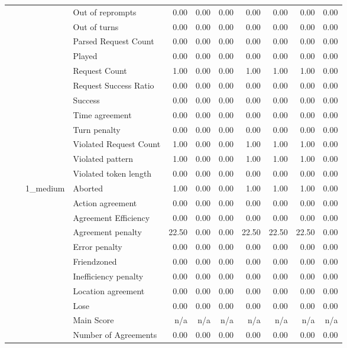 \begin{tabular}{llllrrrrrrr}
 &  &  & Out of reprompts & 0.00 & 0.00 & 0.00 & 0.00 & 0.00 & 0.00 & 0.00 \\
 &  &  & Out of turns & 0.00 & 0.00 & 0.00 & 0.00 & 0.00 & 0.00 & 0.00 \\
 &  &  & Parsed Request Count & 0.00 & 0.00 & 0.00 & 0.00 & 0.00 & 0.00 & 0.00 \\
 &  &  & Played & 0.00 & 0.00 & 0.00 & 0.00 & 0.00 & 0.00 & 0.00 \\
 &  &  & Request Count & 1.00 & 0.00 & 0.00 & 1.00 & 1.00 & 1.00 & 0.00 \\
 &  &  & Request Success Ratio & 0.00 & 0.00 & 0.00 & 0.00 & 0.00 & 0.00 & 0.00 \\
 &  &  & Success & 0.00 & 0.00 & 0.00 & 0.00 & 0.00 & 0.00 & 0.00 \\
 &  &  & Time agreement & 0.00 & 0.00 & 0.00 & 0.00 & 0.00 & 0.00 & 0.00 \\
 &  &  & Turn penalty & 0.00 & 0.00 & 0.00 & 0.00 & 0.00 & 0.00 & 0.00 \\
 &  &  & Violated Request Count & 1.00 & 0.00 & 0.00 & 1.00 & 1.00 & 1.00 & 0.00 \\
 &  &  & Violated pattern & 1.00 & 0.00 & 0.00 & 1.00 & 1.00 & 1.00 & 0.00 \\
 &  &  & Violated token length & 0.00 & 0.00 & 0.00 & 0.00 & 0.00 & 0.00 & 0.00 \\
\cline{3-11}
 &  & \multirow[t]{27}{*}{1_medium} & Aborted & 1.00 & 0.00 & 0.00 & 1.00 & 1.00 & 1.00 & 0.00 \\
 &  &  & Action agreement & 0.00 & 0.00 & 0.00 & 0.00 & 0.00 & 0.00 & 0.00 \\
 &  &  & Agreement Efficiency & 0.00 & 0.00 & 0.00 & 0.00 & 0.00 & 0.00 & 0.00 \\
 &  &  & Agreement penalty & 22.50 & 0.00 & 0.00 & 22.50 & 22.50 & 22.50 & 0.00 \\
 &  &  & Error penalty & 0.00 & 0.00 & 0.00 & 0.00 & 0.00 & 0.00 & 0.00 \\
 &  &  & Friendzoned & 0.00 & 0.00 & 0.00 & 0.00 & 0.00 & 0.00 & 0.00 \\
 &  &  & Inefficiency penalty & 0.00 & 0.00 & 0.00 & 0.00 & 0.00 & 0.00 & 0.00 \\
 &  &  & Location agreement & 0.00 & 0.00 & 0.00 & 0.00 & 0.00 & 0.00 & 0.00 \\
 &  &  & Lose & 0.00 & 0.00 & 0.00 & 0.00 & 0.00 & 0.00 & 0.00 \\
 &  &  & Main Score & n/a & n/a & n/a & n/a & n/a & n/a & n/a \\
 &  &  & Number of Agreements & 0.00 & 0.00 & 0.00 & 0.00 & 0.00 & 0.00 & 0.00 \\

\end{tabular}

